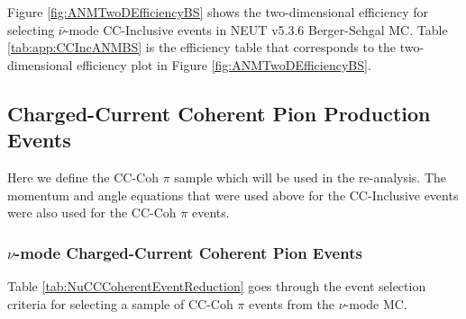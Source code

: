 \documentclass[11pt]{article}
\begin{document}
Figure \ref*{fig:ANMTwoDEfficiencyBS} shows the two-dimensional efficiency for selecting $\bar{\nu}$-mode CC-Inclusive events in NEUT v5.3.6 Berger-Sehgal MC. Table \ref*{tab:app:CCIncANMBS} is the efficiency table that corresponds to the two-dimensional efficiency plot in Figure \ref*{fig:ANMTwoDEfficiencyBS}.


\subsection{Charged-Current Coherent Pion Production Events}
\label{sub:CCCohPion}

Here we define the CC-Coh $\pi$ sample which will be used in the re-analysis. The momentum and angle equations that were used above for the CC-Inclusive events were also used for the CC-Coh $\pi$ events.

\subsubsection{$\nu$-mode Charged-Current Coherent Pion Events}
\label{subsub:NuModeCCCohPion}

Table \ref*{tab:NuCCCoherentEventReduction} goes through the event selection criteria for selecting a sample of CC-Coh $\pi$ events from the $\nu$-mode MC.
\end{document}
